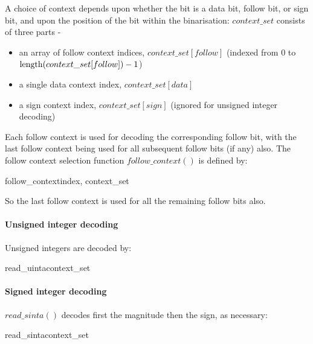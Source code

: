 A choice of context depends upon whether the bit is a data bit, follow bit, 
or sign bit, and upon the position of the bit within the binarisation: 
$context\_set$ consists of three parts -
\begin{itemize}
\item an array of follow context indices, $context\_set[follow]$ (indexed from 0 to 
$\operatorname{length}(context\_set[follow])-1$)
\item a single data context index, $context\_set[data]$ 
\item a sign context index, $context\_set[sign]$ (ignored for unsigned integer decoding)
\end{itemize}

Each follow context is used for decoding the corresponding follow bit, with the
last follow context being used for all subsequent follow bits (if any) also. 
The follow context selection function $follow\_context()$ is defined by:

\begin{pseudo}{follow\_context}{index, context\_set}
\end{pseudo}

So the last follow context is used for all the remaining follow bits also.

\paragraph{Unsigned integer decoding \\}

Unsigned integers are decoded by:

\begin{pseudo}{read\_uinta}{context\_set}
  \bsEND
\bsEND
{}
\end{pseudo}

\paragraph{Signed integer decoding \\}

$read\_sinta()$ decodes first the magnitude then the sign, as necessary:

\begin{pseudo}{read\_sinta}{context\_set}
  \bsEND
\bsEND
{}
\end{pseudo}